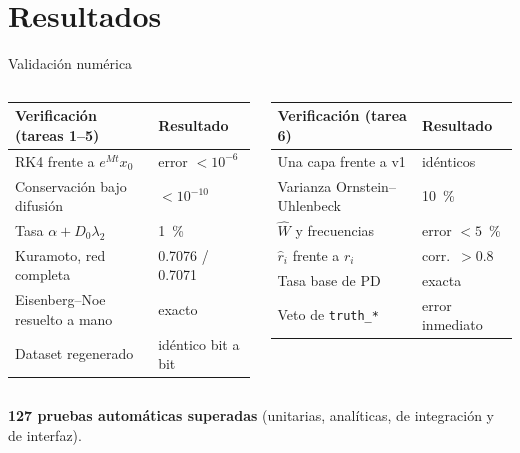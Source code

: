 \documentclass[aspectratio=169,10pt]{beamer}
\begin{document}
\section{Resultados}

\begin{frame}{Validación numérica}
\footnotesize
\begin{columns}[T]
\begin{tabular}{ll}
\toprule
Verificación (tareas 1–5) & Resultado \\
\midrule
RK4 frente a $e^{Mt}x_0$ & error $<10^{-6}$ \\
Conservación bajo difusión & $<10^{-10}$ \\
Tasa $\alpha+D_0\lambda_2$ & 1~\% \\
Kuramoto, red completa & 0.7076 / 0.7071 \\
Eisenberg–Noe resuelto a mano & exacto \\
Dataset regenerado & idéntico bit a bit \\
\bottomrule
\end{tabular}
\begin{tabular}{ll}
\toprule
Verificación (tarea 6) & Resultado \\
\midrule
Una capa frente a v1 & idénticos \\
Varianza Ornstein–Uhlenbeck & 10~\% \\
$\hat W$ y frecuencias & error $<5$~\% \\
$\hat r_i$ frente a $r_i$ & corr.\ $>0.8$ \\
Tasa base de PD & exacta \\
Veto de \texttt{truth\_*} & error inmediato \\
\bottomrule
\end{tabular}
\end{columns}
\vspace{0.4cm}

\normalsize\centering\textbf{127 pruebas automáticas superadas} (unitarias, analíticas,
de integración y de interfaz).
\end{frame}
\end{document}
